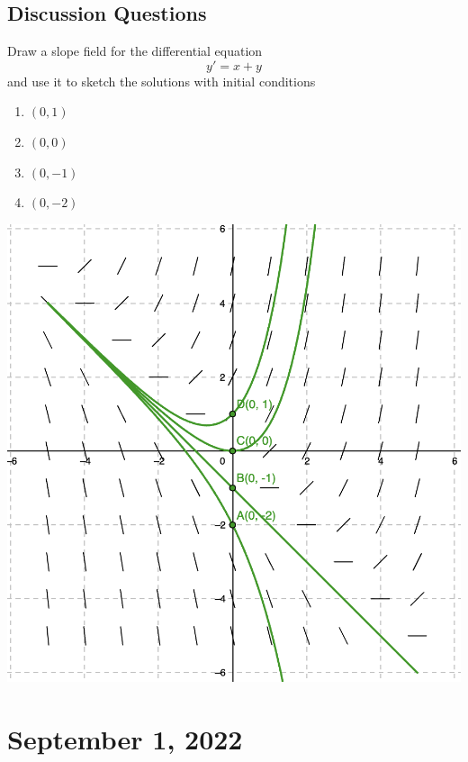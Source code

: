 \documentclass[12pt]{amsart}
\numberwithin{equation}{section}
\theoremstyle{plain} %
\newcommand{\Sept}[1]{\section{September #1, 2022}}
\theoremstyle{definition}
\theoremstyle{remark}
\begin{document}
\subsection*{Discussion Questions} Draw a slope field for the differential equation
\[ y'= x+y\] and use it to sketch the solutions with initial conditions
\begin{enumerate}
\item $(0,1)$
\item $(0,0)$
\item $(0,-1)$
\item $(0,-2)$
\end{enumerate}
\begin{framed}
\begin{center}\includegraphics[scale=.5]{sf4}\end{center}
\end{framed}




\Sept{1}
\end{document}
